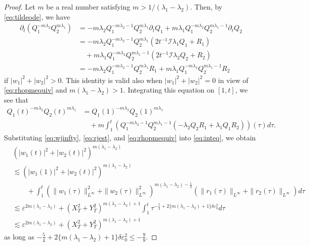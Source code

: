 \documentclass[11pt,a4paper,twosides]{amsart}
\theoremstyle{plain}
\theoremstyle{remark}
\numberwithin{equation}{section}
\def\({\left(}
\def\){\right)}
\def\le{\leqslant}
\newcommand{\pt}{\partial}
\theoremstyle{definition}
\newcommand{\1}{{\bf 1}_{\{|x| < |t|\}}}
\renewcommand{\epsilon}{\varepsilon}
\begin{document}
\begin{proof}
  Let $m$ be a real number satisfying $m > 1/(\lambda_1-\lambda_2)$.
  Then, by \eqref{eq:tildeode},
  we have
  \begin{align*}
    \pt_t(Q_1^{-m\lambda_2}Q_2^{m\lambda_1})
     & = -m\lambda_2Q_1^{-m\lambda_2-1}Q_2^{m\lambda_1}  
     \pt_tQ_1
    + m\lambda_1Q_1^{-m\lambda_2}Q_2^{m\lambda_1-1}
    \pt_tQ_2     \\
     & = -m\lambda_2Q_1^{-m\lambda_2-1}Q_2^{m\lambda_1}
    (2t^{-1}\mathcal{I}\lambda_1Q_1 + R_1)\\
    &\quad+ m\lambda_1Q_1^{-m\lambda_2}Q_2^{m\lambda_1-1}(2t^{-1}\mathcal{I}\lambda_2Q_2 + R_2) \\
     & = -m\lambda_2 Q_1^{-m\lambda_2-1}Q_2^{m\lambda_1}R_1
    + m\lambda_1Q_1^{-m\lambda_2}Q_2^{m\lambda_1-1}R_2
  \end{align*}
  if $|w_1|^2+|w_2|^2>0$. This identity is valid also when $|w_1|^2+|w_2|^2=0$ in view of \eqref{eq:rhopmequiv} and $m(\lambda_1-\lambda_2)>1$.
  Integrating this equation on $[1,t]$, we see that
  \begin{align}\label{eq:inteq}
    Q_1(t)^{-m\lambda_2}Q_2(t)^{m\lambda_1}
     & = Q_1(1)^{-m\lambda_2}Q_2(1)^{m\lambda_1}                       \\ \nonumber
     & \quad + m\int_1^t(Q_1^{-m\lambda_2-1}Q_2^{m\lambda_1-1}
    (-\lambda_2Q_2R_1 + \lambda_1Q_1R_2))(\tau) d\tau.
\end{align}
  Substituting %
  \eqref{eq:wjinfty},  \eqref{eq:rjest}, and \eqref{eq:rhopmequiv} into \eqref{eq:inteq}, we obtain
  \begin{align*}
     & (|w_1(t)|^{2} + |w_2(t)|^{2})^{m(\lambda_1-\lambda_2)}   \\
     & \lesssim (|w_1(1)|^{2} + |w_2(t)|^{2})^{m(\lambda_1-\lambda_2)} \\
     &\qquad + 
    \int_1^t \(\|w_1(\tau)\|_{L^\infty}^2+\|w_2(\tau)\|_{L^\infty}^2\)^{m(\lambda_1-\lambda_2)-\frac12} (\| r_1(\tau)\|_{L^\infty}+\| r_2(\tau)\|_{L^\infty})
    d\tau                                                 \\
    & \lesssim \epsilon^{2m(\lambda_1-\lambda_2)} + (X_T^2 + Y_T^2)^{m(\lambda_1-\lambda_2)+1}
    \int_1^t\tau^{-\frac{5}{4}+2\{m(\lambda_1-\lambda_2)+1\}\delta\epsilon_0^2}d\tau                                                 \\
     & \lesssim \epsilon^{2m(\lambda_1-\lambda_2)} + (X_T^2 + Y_T^2)^{m(\lambda_1-\lambda_2)+1}
  \end{align*}
  as long as $-\frac{5}{4}+2\{m(\lambda_1-\lambda_2)+1\}\delta\epsilon_0^2 \le -\frac98$.

\end{proof}
\end{document}
